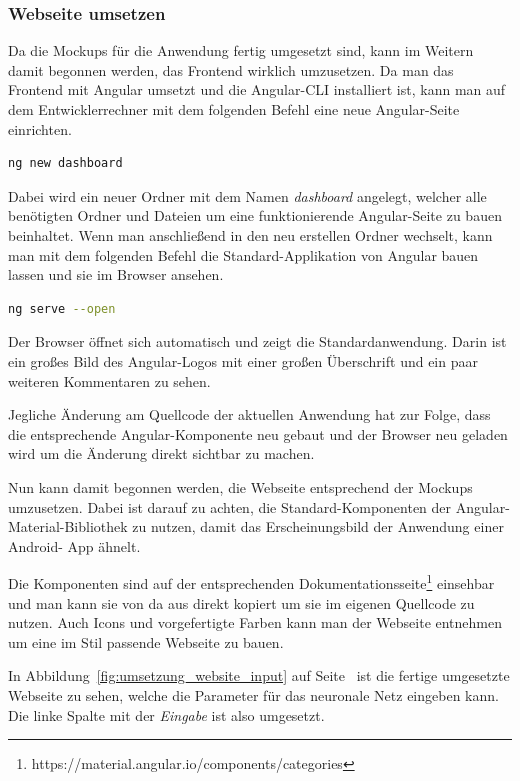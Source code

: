 \subsubsection{Webseite umsetzen}
Da die Mockups für die Anwendung fertig umgesetzt sind, kann im Weitern damit begonnen werden, das Frontend wirklich
umzusetzen. Da man das Frontend mit Angular umsetzt und die Angular-CLI installiert ist, kann man auf dem
Entwicklerrechner mit dem folgenden Befehl eine neue Angular-Seite einrichten.

\begin{lstlisting}[language=bash, caption=Einrichten einer neuen Angular-Seite, label=ls:umsetzung_angular]
    ng new dashboard
\end{lstlisting}

Dabei wird ein neuer Ordner mit dem Namen \textit{dashboard} angelegt, welcher alle benötigten Ordner und Dateien um
eine funktionierende Angular-Seite zu bauen beinhaltet. Wenn man anschließend in den neu erstellen Ordner wechselt, kann
man mit dem folgenden Befehl die Standard-Applikation von Angular bauen lassen und sie im Browser ansehen.

\begin{lstlisting}[language=bash, caption=Bereitstellen der Angular-Webseite, label=ls:umsetzung_angularserve]
    ng serve --open
\end{lstlisting}

Der Browser öffnet sich automatisch und zeigt die Standardanwendung. Darin ist ein großes Bild des Angular-Logos mit
einer großen Überschrift und ein paar weiteren Kommentaren zu sehen.

Jegliche Änderung am Quellcode der aktuellen Anwendung hat zur Folge, dass die entsprechende Angular-Komponente neu
gebaut und der Browser neu geladen wird um die Änderung direkt sichtbar zu machen.

Nun kann damit begonnen werden, die Webseite entsprechend der Mockups umzusetzen. Dabei ist darauf zu achten, die
Standard-Komponenten der Angular-Material-Bibliothek zu nutzen, damit das Erscheinungsbild der Anwendung einer Android-
App ähnelt.

Die Komponenten sind auf der entsprechenden Dokumentationsseite\footnote{https://material.angular.io/components/categories}
einsehbar und man kann sie von da aus direkt kopiert um sie im eigenen Quellcode zu nutzen. Auch Icons und vorgefertigte
Farben kann man der Webseite entnehmen um eine im Stil passende Webseite zu bauen.

In Abbildung~\ref{fig:umsetzung_website_input} auf Seite~\pageref{fig:umsetzung_website_input} ist die fertige
umgesetzte Webseite zu sehen, welche die Parameter für das neuronale Netz eingeben kann. Die linke Spalte mit der
\textit{Eingabe} ist also umgesetzt.

